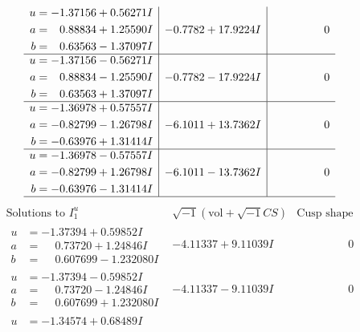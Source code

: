 \documentclass[1p]{elsarticle_modified}
\theoremstyle{definition}
\newcommand{\I}{\sqrt{-1}}
\begin{document}
$$\begin{array}{c|c|c}
\begin{aligned}
u &= -1.37156 + 0.56271 I \\
a &= \phantom{-}0.88834 + 1.25590 I \\
b &= \phantom{-}0.63563 - 1.37097 I\end{aligned}
 & -0.7782 + 17.9224 I & \phantom{-0.000000 } 0 \\ \hline\begin{aligned}
u &= -1.37156 - 0.56271 I \\
a &= \phantom{-}0.88834 - 1.25590 I \\
b &= \phantom{-}0.63563 + 1.37097 I\end{aligned}
 & -0.7782 - 17.9224 I & \phantom{-0.000000 } 0 \\ \hline\begin{aligned}
u &= -1.36978 + 0.57557 I \\
a &= -0.82799 - 1.26798 I \\
b &= -0.63976 + 1.31414 I\end{aligned}
 & -6.1011 + 13.7362 I & \phantom{-0.000000 } 0 \\ \hline\begin{aligned}
u &= -1.36978 - 0.57557 I \\
a &= -0.82799 + 1.26798 I \\
b &= -0.63976 - 1.31414 I\end{aligned}
 & -6.1011 - 13.7362 I & \phantom{-0.000000 } 0\\
 \hline 
 \end{array}$$\newpage$$\begin{array}{c|c|c}  
\text{Solutions to }I^u_{1}& \I (\text{vol} + \sqrt{-1}CS) & \text{Cusp shape}\\
 \hline 
\begin{aligned}
u &= -1.37394 + 0.59852 I \\
a &= \phantom{-}0.73720 + 1.24846 I \\
b &= \phantom{-}0.607699 - 1.232080 I\end{aligned}
 & -4.11337 + 9.11039 I & \phantom{-0.000000 } 0 \\ \hline\begin{aligned}
u &= -1.37394 - 0.59852 I \\
a &= \phantom{-}0.73720 - 1.24846 I \\
b &= \phantom{-}0.607699 + 1.232080 I\end{aligned}
 & -4.11337 - 9.11039 I & \phantom{-0.000000 } 0 \\ \hline\begin{aligned}
u &= -1.34574 + 0.68489 I \\

\end{aligned}
\end{array}$$
\end{document}
